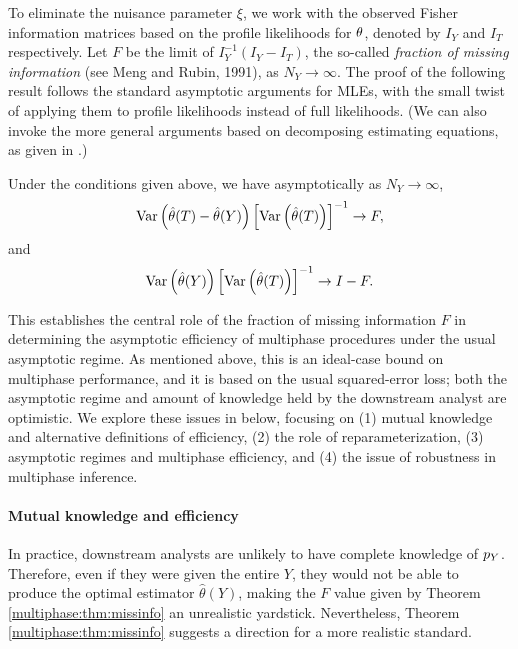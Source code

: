 To eliminate the nuisance parameter $\xi$, we work with the observed Fisher information matrices based on the profile likelihoods for $\theta$, denoted by $I_Y$ and $I_T$ respectively.   Let $F$ be the limit of $I_Y^{-1}(I_Y-I_T)$, the so-called \textit{fraction of missing information} (see Meng and Rubin, 1991), as   $N_Y \rightarrow \infty$.
 The proof of the following result follows the standard asymptotic arguments for MLEs, with the small twist of applying them to profile likelihoods instead of full likelihoods. (We can also invoke the more general arguments based on decomposing estimating equations, as given in \citet{Xie2012}.) 
%
\begin{theorem}
\label{multiphase:thm:missinfo} Under the conditions given above, we have asymptotically as $N_Y \rightarrow \infty$,
\begin{equation}\label{multiphase:eq:regret}
\Var\left(\est(T) - \est(Y)\right) \left[\Var\left(\est(T)\right)\right]^{-1} \rightarrow F,
\end{equation}
and
\begin{equation}\label{multiphase:eq:frac}
\Var\left(\est(Y)\right) \left[\Var\left(\est(T)\right)\right]^{-1} \rightarrow I - F.
\end{equation}
\end{theorem}

This establishes the central role of the fraction of missing information $F$ in determining the asymptotic efficiency of multiphase procedures under the usual asymptotic regime.
As mentioned above, this is an ideal-case bound on multiphase performance, and it is based on the usual squared-error loss; both the asymptotic regime and amount of knowledge held by the downstream analyst are optimistic.
We explore these issues in below, focusing on (1) mutual knowledge and alternative definitions of efficiency, (2) the role of reparameterization, (3) asymptotic regimes and multiphase efficiency, and (4) the issue of robustness in multiphase inference.

\paragraph{Mutual knowledge and efficiency}
In practice, downstream analysts are unlikely to have complete knowledge of $p_Y$. Therefore, even if they were given the entire $Y$, they would not be able to produce the optimal estimator $\hat\theta(Y)$, making 
the $F$ value given by Theorem \ref{multiphase:thm:missinfo} an unrealistic 
yardstick. Nevertheless, Theorem \ref{multiphase:thm:missinfo} suggests a direction for a more realistic standard. 

